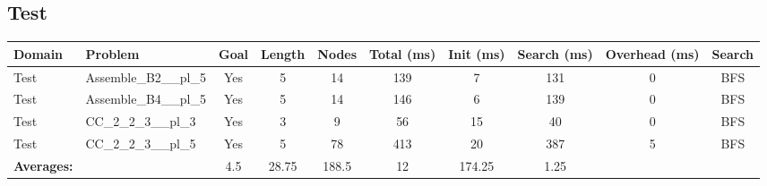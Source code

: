 \documentclass{article}
\begin{document}
\subsection*{Test}
\begin{tabular}{llcccccccc}
\toprule
Domain & Problem & Goal & Length & Nodes & Total (ms) & Init (ms) & Search (ms) & Overhead (ms) & Search \\
\midrule
Test & Assemble\_B2\_\_pl\_5 & Yes & 5 & 14 & 139 & 7 & 131 & 0 & BFS \\
Test & Assemble\_B4\_\_pl\_5 & Yes & 5 & 14 & 146 & 6 & 139 & 0 & BFS \\
Test & CC\_2\_2\_3\_\_pl\_3 & Yes & 3 & 9 & 56 & 15 & 40 & 0 & BFS \\
Test & CC\_2\_2\_3\_\_pl\_5 & Yes & 5 & 78 & 413 & 20 & 387 & 5 & BFS \\
\textbf{Averages:} & & 4.5 & 28.75 & 188.5 & 12 & 174.25 & 1.25 & \\
\bottomrule
\end{tabular}
\\[0.7cm]
\newpage
\end{document}
